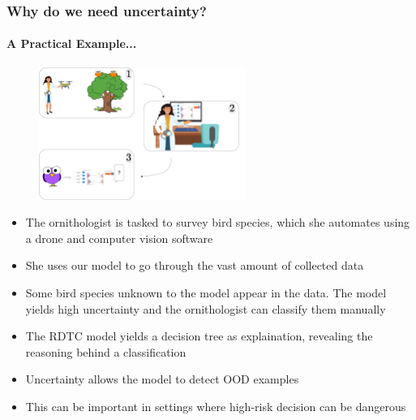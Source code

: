 \documentclass[9pt]{beamer}
\begin{document}
\begin{frame}
\frametitle{Why do we need uncertainty?}
\framesubtitle{A Practical Example...}
	\begin{figure}
		\centering
		\includegraphics[width=0.6\textwidth]{images/ornithology.pdf}
	\end{figure}
	\begin{itemize}\setlength\itemsep{1em}
	\item The ornithologist is tasked to survey bird species, which she automates using a drone and computer vision software
	\item She uses our model to go through the vast amount of collected data
	\item Some bird species unknown to the model appear in the data. The model yields high uncertainty and the ornithologist can classify them manually
	\end{itemize}
\end{frame}

\begin{frame}[plain]
\begin{itemize}
	\item The RDTC model yields a decision tree as explaination, revealing the reasoning behind a classification
	\item Uncertainty allows the model to detect OOD examples
	\item This can be important in settings where high-risk decision can be dangerous
\end{itemize}
\end{frame}
\end{document}
